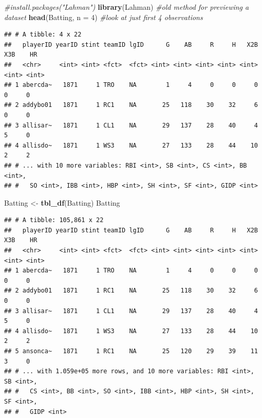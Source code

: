 \documentclass[
]{book}
\newenvironment{Shaded}{\begin{snugshade}}{\end{snugshade}}
\newcommand{\CommentTok}[1]{\textcolor[rgb]{0.56,0.35,0.01}{\textit{#1}}}
\newcommand{\DataTypeTok}[1]{\textcolor[rgb]{0.13,0.29,0.53}{#1}}
\newcommand{\DecValTok}[1]{\textcolor[rgb]{0.00,0.00,0.81}{#1}}
\newcommand{\KeywordTok}[1]{\textcolor[rgb]{0.13,0.29,0.53}{\textbf{#1}}}
\newcommand{\NormalTok}[1]{#1}
\newcommand{\StringTok}[1]{\textcolor[rgb]{0.31,0.60,0.02}{#1}}
\theoremstyle{definition}
\theoremstyle{definition}
\theoremstyle{definition}
\theoremstyle{remark}
\begin{document}
\begin{Shaded}
\begin{Highlighting}[]
\CommentTok{#install.packages("Lahman")}
\KeywordTok{library}\NormalTok{(Lahman)}
\CommentTok{#old method for previewing a dataset}
\KeywordTok{head}\NormalTok{(Batting, }\DataTypeTok{n =} \DecValTok{4}\NormalTok{) }\CommentTok{#look at just first 4 observations}
\end{Highlighting}
\end{Shaded}

\begin{verbatim}
## # A tibble: 4 x 22
##   playerID yearID stint teamID lgID      G    AB     R     H   X2B   X3B    HR
##   <chr>     <int> <int> <fct>  <fct> <int> <int> <int> <int> <int> <int> <int>
## 1 abercda~   1871     1 TRO    NA        1     4     0     0     0     0     0
## 2 addybo01   1871     1 RC1    NA       25   118    30    32     6     0     0
## 3 allisar~   1871     1 CL1    NA       29   137    28    40     4     5     0
## 4 allisdo~   1871     1 WS3    NA       27   133    28    44    10     2     2
## # ... with 10 more variables: RBI <int>, SB <int>, CS <int>, BB <int>,
## #   SO <int>, IBB <int>, HBP <int>, SH <int>, SF <int>, GIDP <int>
\end{verbatim}

\begin{Shaded}
\begin{Highlighting}[]
\NormalTok{Batting <-}\StringTok{ }\KeywordTok{tbl_df}\NormalTok{(Batting)}
\NormalTok{Batting}
\end{Highlighting}
\end{Shaded}

\begin{verbatim}
## # A tibble: 105,861 x 22
##   playerID yearID stint teamID lgID      G    AB     R     H   X2B   X3B    HR
##   <chr>     <int> <int> <fct>  <fct> <int> <int> <int> <int> <int> <int> <int>
## 1 abercda~   1871     1 TRO    NA        1     4     0     0     0     0     0
## 2 addybo01   1871     1 RC1    NA       25   118    30    32     6     0     0
## 3 allisar~   1871     1 CL1    NA       29   137    28    40     4     5     0
## 4 allisdo~   1871     1 WS3    NA       27   133    28    44    10     2     2
## 5 ansonca~   1871     1 RC1    NA       25   120    29    39    11     3     0
## # ... with 1.059e+05 more rows, and 10 more variables: RBI <int>, SB <int>,
## #   CS <int>, BB <int>, SO <int>, IBB <int>, HBP <int>, SH <int>, SF <int>,
## #   GIDP <int>
\end{verbatim}
\end{document}
